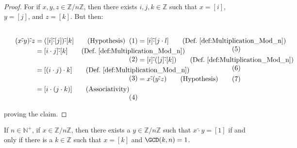 \documentclass{article}                                                        %
\begin{document}
            \begin{proof}
                For if $x,y,z\in\mathbb{Z}/n\mathbb{Z}$, then there exists
                $i,j,k\in\mathbb{Z}$ such that $x=[i]$, $y=[j]$, and $z=[k]$.
                But then:
                \par
                \begin{subequations}
                    \begin{minipage}[t]{0.54\textwidth}
                        \centering
                        \begin{align}
                            (x\tilde{\cdot}y)\tilde{\cdot}z
                            &=([i]\tilde{\cdot}[j])\tilde{\cdot}[k]
                                \tag{Hypothesis}\\
                            &=[i\cdot{j}]\tilde{\cdot}[k]
                                \tag{Def.~\ref{def:Multiplication_Mod_n}}\\
                            &=[(i\cdot{j})\cdot{k}]
                                \tag{Def.~\ref{def:Multiplication_Mod_n}}\\
                            &=[i\cdot(j\cdot{k})]
                                \tag{Associativity}
                        \end{align}
                    \end{minipage}
                    \hfill
                    \begin{minipage}[t]{0.44\textwidth}
                        \begin{align}
                            &=[i]\tilde{\cdot}[j\cdot{l}]
                                \tag{Def.~\ref{def:Multiplication_Mod_n}}\\
                            &=[i]\tilde{\cdot}([j]\tilde{\cdot}[k])
                                \tag{Def.~\ref{def:Multiplication_Mod_n}}\\
                            &=x\tilde{\cdot}(y\tilde{\cdot}z)
                                \tag{Hypothesis}
                        \end{align}
                    \end{minipage}
                \end{subequations}
                \par\vspace{2.5ex}
                proving the claim.
            \end{proof}
            \begin{theorem}
                \label{thm:Invertible_Mod_n_iff_Relatively_Prime}%
                If $n\in\mathbb{N}^{+}$, if $x\in\mathbb{Z}/n\mathbb{Z}$, then
                there exists a $y\in\mathbb{Z}/n\mathbb{Z}$ such that
                $x\tilde{\cdot}{y}=[1]$ if and only if there is a
                $k\in\mathbb{Z}$ such that $x=[k]$ and $\GCD(k,n)=1$.
            \end{theorem}
\end{document}
